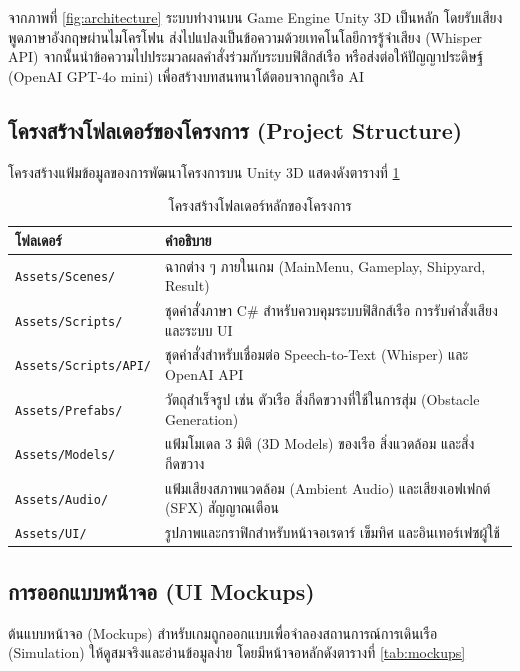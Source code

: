 จากภาพที่ \ref{fig:architecture} ระบบทำงานบน Game Engine Unity 3D เป็นหลัก โดยรับเสียงพูดภาษาอังกฤษผ่านไมโครโฟน ส่งไปแปลงเป็นข้อความด้วยเทคโนโลยีการรู้จำเสียง (Whisper API)\cite{aguirre2023} จากนั้นนำข้อความไปประมวลผลคำสั่งร่วมกับระบบฟิสิกส์เรือ หรือส่งต่อให้ปัญญาประดิษฐ์ (OpenAI GPT-4o mini) เพื่อสร้างบทสนทนาโต้ตอบจากลูกเรือ AI

\subsection{โครงสร้างโฟลเดอร์ของโครงการ (Project Structure)}

โครงสร้างแฟ้มข้อมูลของการพัฒนาโครงการบน Unity 3D แสดงดังตารางที่ \ref{tab:folder}

\begin{table}[H]
\centering
\caption{โครงสร้างโฟลเดอร์หลักของโครงการ}
\label{tab:folder}
\begin{tabular}{|p{4.5cm}|p{9.2cm}|}
\hline
\textbf{โฟลเดอร์} & \textbf{คำอธิบาย} \\
\hline
\texttt{Assets/Scenes/} & ฉากต่าง ๆ ภายในเกม (MainMenu, Gameplay, Shipyard, Result) \\ \hline
\texttt{Assets/Scripts/} & ชุดคำสั่งภาษา C\# สำหรับควบคุมระบบฟิสิกส์เรือ การรับคำสั่งเสียง และระบบ UI \\ \hline
\texttt{Assets/Scripts/API/} & ชุดคำสั่งสำหรับเชื่อมต่อ Speech-to-Text (Whisper) และ OpenAI API \\ \hline
\texttt{Assets/Prefabs/} & วัตถุสำเร็จรูป เช่น ตัวเรือ สิ่งกีดขวางที่ใช้ในการสุ่ม (Obstacle Generation) \\ \hline
\texttt{Assets/Models/} & แฟ้มโมเดล 3 มิติ (3D Models) ของเรือ สิ่งแวดล้อม และสิ่งกีดขวาง \\ \hline
\texttt{Assets/Audio/} & แฟ้มเสียงสภาพแวดล้อม (Ambient Audio) และเสียงเอฟเฟกต์ (SFX) สัญญาณเตือน \\ \hline
\texttt{Assets/UI/} & รูปภาพและกราฟิกสำหรับหน้าจอเรดาร์ เข็มทิศ และอินเทอร์เฟซผู้ใช้ \\
\hline
\end{tabular}
\end{table}

\subsection{การออกแบบหน้าจอ (UI Mockups)}

ต้นแบบหน้าจอ (Mockups) สำหรับเกมถูกออกแบบเพื่อจำลองสถานการณ์การเดินเรือ (Simulation) ให้ดูสมจริงและอ่านข้อมูลง่าย โดยมีหน้าจอหลักดังตารางที่ \ref{tab:mockups}

